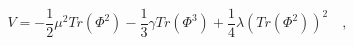 \begin{equation}
V=-\frac{1}{2}\mu^2Tr\left(\Phi^2\right) -\frac{1}{3}\gamma Tr\left(\Phi^3\right) + \frac{1}{4} \lambda \left(Tr\left(\Phi^2\right)\right)^2\quad,
\label{potential}
\end{equation}

